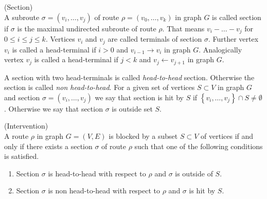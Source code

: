 \begin{defi} (Section) \\
	A subroute $\sigma = (v_i, \dots, v_j)$ of route $\rho = (v_0, \dots, v_k)$ in graph $G$ is called section if $			\sigma$ is the maximal undirected subroute of route $\rho$. That means $v_i - \dots - v_j$ for $0 \le i \le j 			\le k$. Vertices $v_i$ and $v_j$ are called terminals of section $\sigma$. Further vertex $v_i$ is called a 			head-terminal if $i>0$ and $v_{i-1} \rightarrow v_i$ in graph $G$. Analogically vertex $v_j$ is called 
	a head-terminal if $j<k$ and $v_j \leftarrow v_{j+1}$ in graph $G$.
\end{defi}


A section with two head-terminals is called \textit{head-to-head} section. Otherwise the section is called 
\textit{non head-to-head}. For a given set of vertices $S \subset V$ in graph $G$ and section $\sigma = (v_i, \dots, v_j)$ we say that section is hit by $S$ if $\left\lbrace v_i , \dots, v_j \right\rbrace \cap S \neq \emptyset$. Otherwise we say that section $\sigma$ is outside set $S$.



\begin{defi} (Intervention) \\
	A route $\rho$ in graph $G = (V, E)$ is blocked by a subset $S \subset V$ of vertices if and only if there 				exists a section $\sigma$ of route $\rho$ such that one of the following conditions is satisfied.
	
	\begin{enumerate}
		\item Section $\sigma$ is head-to-head with respect to $\rho$ and $\sigma$ is outside of $S$.
		\item Section $\sigma$ is non head-to-head with respect to $\rho$ and $\sigma$ is hit by $S$.
	\end{enumerate}
	
\end{defi}




